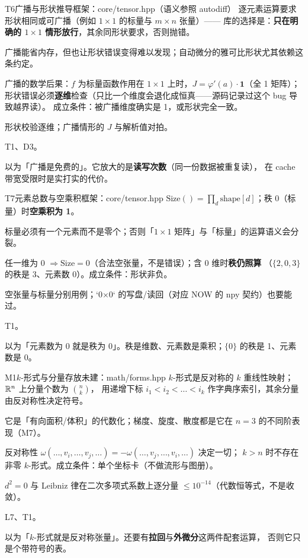 \begin{know}{T6}{广播与形状推导}{框架：core/tensor.hpp（语义参照 autodiff）}
 逐元素运算要求形状相同或可广播（例如 $1\times1$ 的标量与 $m\times n$ 张量）——
库的选择是：\textbf{只在明确的 $1\times1$ 情形放行}，其余同形状要求，否则抛错。

 广播能省内存，但也让形状错误变得难以发现；自动微分的雅可比形状尤其依赖这条约定。

 广播的数学后果：$f$ 为标量函数作用在 $1\times1$ 上时，$J=\varphi'(a)\cdot\mathbf 1$（全 1 矩阵）；
形状错误必须\textbf{逐维}检查（只比一个维度会退化成恒真——源码记录过这个 bug 导致越界读）。
成立条件：被广播维度确实是 1，或形状完全一致。

 形状校验逐维；广播情形的 $J$ 与解析值对拍。

 T1、D3。

 以为「广播是免费的」。它放大的是\textbf{读写次数}（同一份数据被重复读），
在 cache 带宽受限时是实打实的代价。
\end{know}

\begin{know}{T7}{元素总数与空乘积}{框架：core/tensor.hpp}
 $\text{Size}()=\prod_d\text{shape}[d]$；秩 0（标量）时\textbf{空乘积为 1}。

 标量必须有一个元素而不是零个；否则「$1\times1$ 矩阵」与「标量」的运算语义会分裂。

 任一维为 0 $\Rightarrow\text{Size}=0$（合法空张量，不是错误）；含 0 维时\textbf{秩仍照算}
（$\{2,0,3\}$ 的秩是 3、元素数 0）。成立条件：形状非负。

 空张量与标量分别用例；`0×0` 的写盘/读回（对应 NOW 的 npy 契约）也要能过。

 T1。

 以为「元素数为 0 就是秩为 0」。秩是维数、元素数是乘积；$\{0\}$ 的秩是 1、元素数是 0。
\end{know}

\begin{know}{M1}{$k$-形式与分量存放}{未建：math/forms.hpp}
 $k$-形式是反对称的 $k$ 重线性映射；$\mathbb{R}^{n}$ 上分量个数为 $\binom nk$，
用递增下标 $i_1<i_2<\dots<i_k$ 作字典序索引，其余分量由反对称性决定符号。

 它是「有向面积/体积」的代数化；梯度、旋度、散度都是它在 $n=3$ 的不同阶表现（M7）。

 反对称性 $\omega(\dots,v_i,\dots,v_j,\dots)=-\omega(\dots,v_j,\dots,v_i,\dots)$ 决定一切；
$k>n$ 时不存在非零 $k$-形式。成立条件：单个坐标卡（不做流形与图册）。

 $d^{2}=0$ 与 Leibniz 律在二次多项式系数上逐分量 $\le10^{-14}$（代数恒等式，不是收敛）。

 L7、T1。

 以为「$k$-形式就是反对称张量」。还要有\textbf{拉回}与\textbf{外微分}这两件配套运算，
否则它只是个带符号的表。
\end{know}

